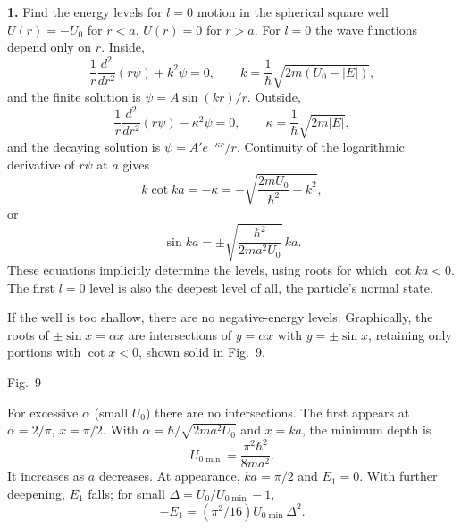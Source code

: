 \ProblemHeading

\textbf{1.} Find the energy levels for $l=0$ motion in the spherical square
well $U(r)=-U_0$ for $r<a$, $U(r)=0$ for $r>a$.
\SolutionHeading For $l=0$ the wave functions depend only on $r$. Inside,
\[
 \frac1r\frac{d^2}{dr^2}(r\psi)+k^2\psi=0,\qquad
 k=\frac1\hbar\sqrt{2m(U_0-|E|)},
\]
and the finite solution is $\psi=A\sin(kr)/r$. Outside,
\[
 \frac1r\frac{d^2}{dr^2}(r\psi)-\kappa^2\psi=0,\qquad
 \kappa=\frac1\hbar\sqrt{2m|E|},
\]
and the decaying solution is $\psi=A'e^{-\kappa r}/r$. Continuity of the
logarithmic derivative of $r\psi$ at $a$ gives
\begin{equation}
 k\cot ka=-\kappa=-\sqrt{\frac{2mU_0}{\hbar^2}-k^2},\tag{1}
\end{equation}
or
\begin{equation}
 \sin ka=\pm\sqrt{\frac{\hbar^2}{2ma^2U_0}}\,ka.\tag{2}
\end{equation}
These equations implicitly determine the levels, using roots for which
$\cot ka<0$. The first $l=0$ level is also the deepest level of all, the
particle's normal state.

If the well is too shallow, there are no negative-energy levels. Graphically,
the roots of $\pm\sin x=\alpha x$ are intersections of $y=\alpha x$ with
$y=\pm\sin x$, retaining only portions with $\cot x<0$, shown solid in
Fig.~9.

\begin{center}

\small Fig.~9
\end{center}

For excessive $\alpha$ (small $U_0$) there are no intersections. The first
appears at $\alpha=2/\pi$, $x=\pi/2$. With
$\alpha=\hbar/\sqrt{2ma^2U_0}$ and $x=ka$, the minimum depth is
\begin{equation}U_{0\min}=\frac{\pi^2\hbar^2}{8ma^2}.\tag{3}\end{equation}
It increases as $a$ decreases. At appearance, $ka=\pi/2$ and $E_1=0$.
With further deepening, $E_1$ falls; for small
$\Delta=U_0/U_{0\min}-1$,
\begin{equation}-E_1=(\pi^2/16)U_{0\min}\Delta^2.\tag{4}\end{equation}

